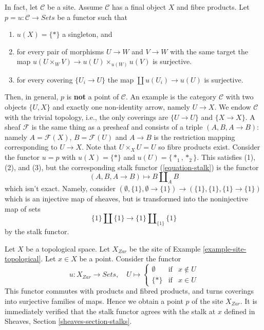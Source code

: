 \begin{remark}
\label{remark-improve-proposition-points-limits}
In fact, let $\mathcal{C}$ be a site. Assume $\mathcal{C}$ has a final object
$X$  and fibre products. Let $p = u: \mathcal{C} \to \textit{Sets}$ be a
functor such that
\begin{enumerate}
\item $u(X) = \{*\}$ a singleton, and
\item for every pair of morphisms $U \to W$ and $V \to W$ with
the same target the map
$u(U \times_W V) \to u(U) \times_{u(W)} u(V)$ is surjective.
\item for every covering $\{U_i \to U\}$ the map
$\coprod u(U_i) \to u(U)$ is surjective.
\end{enumerate}
Then, in general, $p$ is {\bf not} a point of $\mathcal{C}$.
An example is the category $\mathcal{C}$ with two objects $\{U, X\}$
and exactly one non-identity arrow, namely $U \to X$. We endow $\mathcal{C}$
with the trivial topology, i.e., the only coverings are $\{U \to U\}$ and
$\{X \to X\}$. A sheaf $\mathcal{F}$ is the same thing as a presheaf and
consists of a triple $(A, B, A \to B)$: namely $A = \mathcal{F}(X)$,
$B = \mathcal{F}(U)$ and $A \to B$ is the restriction mapping corresponding
to $U \to X$. Note that $U \times_X U = U$ so fibre products exist.
Consider the functor $u = p$ with $u(X) = \{*\}$ and $u(U) = \{*_1, *_2\}$.
This satisfies (1), (2), and (3), but the corresponding stalk functor
(\ref{equation-stalk}) is the functor
$$
(A, B, A \to B) \longmapsto B \amalg_A B
$$
which isn't exact. Namely, consider
$(\emptyset, \{1\}, \emptyset \to \{1\}) \to (\{1\}, \{1\}, \{1\} \to \{1\})$
which is an injective map of sheaves, but is transformed into the noninjective
map of sets
$$
\{1\} \amalg \{1\} \longrightarrow \{1\} \amalg_{\{1\}} \{1\}
$$
by the stalk functor.
\end{remark}

\begin{example}
\label{example-point-topological}
Let $X$ be a topological space. Let $X_{Zar}$ be the site of
Example \ref{example-site-topological}.
Let $x \in X$ be a point. Consider the functor
$$
u : X_{Zar} \longrightarrow \textit{Sets}, \quad
U \mapsto
\left\{
\begin{matrix}
\emptyset & \text{if} & x \not \in U \\
\{*\} & \text{if} & x \in U
\end{matrix}
\right.
$$
This functor commutes with products and fibred products,
and turns coverings into surjective families of maps.
Hence we obtain a point $p$ of the site $X_{Zar}$.
It is immediately verified that the stalk functor
agrees with the stalk at $x$ defined in
Sheaves, Section
\ref{sheaves-section-stalks}.
\end{example}


